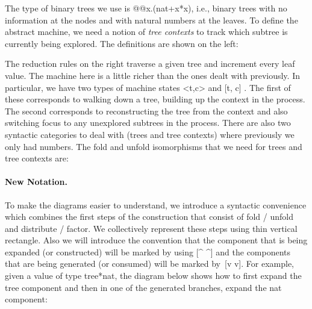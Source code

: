 \documentclass{llncs}
\begin{document}
The type of binary trees we use is {{@@x.(nat+x*x)}}, i.e., binary trees with
no information at the nodes and with natural numbers at the leaves. To define
the abstract machine, we need a notion of \emph{tree contexts} to track which
subtree is currently being explored. The definitions are shown on the left:

\vspace{-15pt}
\begin{small}
\begin{multicols}{2}
%

\end{multicols}
\end{small}

The reduction rules on the right traverse a given tree and increment
every leaf value.  The machine here is a little richer than the ones
dealt with previously. In particular, we have two types of machine
states {{<t,c>}} and {{ {[t, c]} }}. The first of these corresponds
to walking down a tree, building up the context in the process. The
second corresponds to reconstructing the tree from the context and
also switching focus to any unexplored subtrees in the process. There
are also two syntactic categories to deal with (trees and tree
contexts) where previously we only had numbers. The {{fold}} and
{{unfold}} isomorphisms that we need for trees and tree contexts are:

\begin{small}
  
\end{small}

\paragraph*{New Notation.}
To make the diagrams easier to understand, we introduce a syntactic
convenience which combines the first steps of the construction that consist
of {{fold}} / {{unfold}} and {{distribute}} / {{factor}}. We collectively
represent these steps using thin vertical rectangle. Also we will introduce
the convention that the component that is being expanded (or constructed) will be
marked by using {{[^ ^]}} and the components that are being generated (or consumed) will be
marked by~{{[v v]}}. For example, given a value of type {{tree*nat}}, the
diagram below shows how to first expand the {{tree}} component and then in
one of the generated branches, expand the {{nat}} component:
\end{document}
